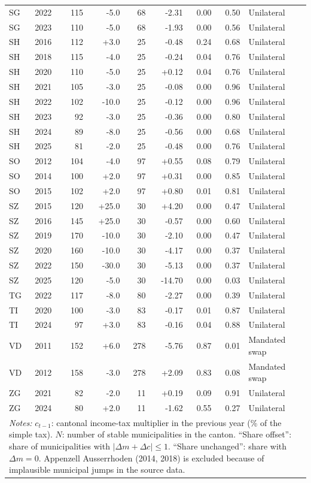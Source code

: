 \begin{longtable}{llrrrrrrl}
SG & 2022 & 115 & -5.0 & 68 & -2.31 & 0.00 & 0.50 & Unilateral \\
SG & 2023 & 110 & -5.0 & 68 & -1.93 & 0.00 & 0.56 & Unilateral \\
SH & 2016 & 112 & +3.0 & 25 & -0.48 & 0.24 & 0.68 & Unilateral \\
SH & 2018 & 115 & -4.0 & 25 & -0.24 & 0.04 & 0.76 & Unilateral \\
SH & 2020 & 110 & -5.0 & 25 & +0.12 & 0.04 & 0.76 & Unilateral \\
SH & 2021 & 105 & -3.0 & 25 & -0.08 & 0.00 & 0.96 & Unilateral \\
SH & 2022 & 102 & -10.0 & 25 & -0.12 & 0.00 & 0.96 & Unilateral \\
SH & 2023 & 92 & -3.0 & 25 & -0.36 & 0.00 & 0.80 & Unilateral \\
SH & 2024 & 89 & -8.0 & 25 & -0.56 & 0.00 & 0.68 & Unilateral \\
SH & 2025 & 81 & -2.0 & 25 & -0.48 & 0.00 & 0.76 & Unilateral \\
SO & 2012 & 104 & -4.0 & 97 & +0.55 & 0.08 & 0.79 & Unilateral \\
SO & 2014 & 100 & +2.0 & 97 & +0.31 & 0.00 & 0.85 & Unilateral \\
SO & 2015 & 102 & +2.0 & 97 & +0.80 & 0.01 & 0.81 & Unilateral \\
SZ & 2015 & 120 & +25.0 & 30 & +4.20 & 0.00 & 0.47 & Unilateral \\
SZ & 2016 & 145 & +25.0 & 30 & -0.57 & 0.00 & 0.60 & Unilateral \\
SZ & 2019 & 170 & -10.0 & 30 & -2.10 & 0.00 & 0.47 & Unilateral \\
SZ & 2020 & 160 & -10.0 & 30 & -4.17 & 0.00 & 0.37 & Unilateral \\
SZ & 2022 & 150 & -30.0 & 30 & -5.13 & 0.00 & 0.37 & Unilateral \\
SZ & 2025 & 120 & -5.0 & 30 & -14.70 & 0.00 & 0.03 & Unilateral \\
TG & 2022 & 117 & -8.0 & 80 & -2.27 & 0.00 & 0.39 & Unilateral \\
TI & 2020 & 100 & -3.0 & 83 & -0.17 & 0.01 & 0.87 & Unilateral \\
TI & 2024 & 97 & +3.0 & 83 & -0.16 & 0.04 & 0.88 & Unilateral \\
VD & 2011 & 152 & +6.0 & 278 & -5.76 & 0.87 & 0.01 & Mandated swap \\
VD & 2012 & 158 & -3.0 & 278 & +2.09 & 0.83 & 0.08 & Mandated swap \\
ZG & 2021 & 82 & -2.0 & 11 & +0.19 & 0.09 & 0.91 & Unilateral \\
ZG & 2024 & 80 & +2.0 & 11 & -1.62 & 0.55 & 0.27 & Unilateral \\
\bottomrule
\multicolumn{9}{p{0.95\textwidth}}{\footnotesize \emph{Notes:} $c_{t-1}$: cantonal income-tax multiplier in the previous year (\% of the simple tax). $N$: number of stable municipalities in the canton. ``Share offset'': share of municipalities with $|\Delta m+\Delta c|\le 1$. ``Share unchanged'': share with $\Delta m=0$. Appenzell Ausserrhoden (2014, 2018) is excluded because of implausible municipal jumps in the source data.}\\
\end{longtable}